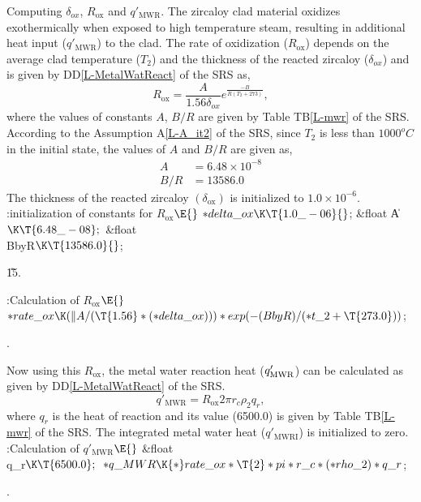 \documentclass[letterpaper,12pt,baseclass=report]{cweb-hy}
\begin{document}
{
\fi

Computing ${\delta_{ox}}$, $R_{\text{ox}}$ and $q'_{\text{MWR}}$.%
\label{delroxqmwr}
The zircaloy clad material oxidizes exothermically when	exposed	to high
temperature
steam, resulting in additional heat input ($q'_{\text{MWR}}$) to the clad. The
rate of
oxidization ($R_{\text{ox}}$) depends on the average clad temperature ($T_2$)
and the
thickness of the reacted zircaloy ($\delta_{ox}$) and is given by
DD\ref{L-MetalWatReact} of the SRS as,
\begin{equation}
{R_{\text{ox}}}= \frac{A}{1.56  \delta_{ox}} e^{\frac{-B}{R(T_2+273)}},
\end{equation}
where the values of constants $A$, $B/R$ are given by Table TB\ref{L-mwr} of
the SRS.
According to the Assumption A\ref{L-A_it2} of the SRS, since $T_2$ is less than
$1000^oC$
in the initial state, the values of $A$ and $B/R$ are given as,
\begin{align}
A&=6.48\times 10^{-8}\\
B/R&=13586.0 \label{a}
\end{align}
The thickness of the reacted zircaloy $(\delta_{\text{ox}})$ is initialized to
$1.0\times 10^{-6}$.
\Y\B\4:initialization of constants for $R_{\text{ox}}$\X${}\E{}$\6
${*}\\{delta\_ox}\K\T{1.0\_-06}{}$;\7
\&{float} \|A${}\K\T{6.48\_-08};{}$\6
\&{float} \\{BbyR}${}\K\T{13586.0}{}$;\par
\U15.\fi

\Y\B\4:Calculation of $R_{\text{ox}}$\X${}\E{}$\6
${*}\\{rate\_ox}\K(\|A/(\T{1.56}*({*}\\{delta\_ox})))*\\{exp}({-}(%
\\{BbyR})/({*}\\{t\_2}+\T{273.0})){}$;\par
{}.\fi

Now using this $R_{\text{ox}}$, the metal water reaction heat ($q'_{%
\mathrm{MWR}}$)
can be calculated as given by DD\ref{L-MetalWatReact} of the SRS.
\begin{equation}
q'_{\mathrm{MWR}}= {R_{\text{ox}}} 2\pi r_c  \rho_2 q_r,
\end{equation}
where $q_r$ is the heat of reaction and its value (6500.0) is given by Table
TB\ref{L-mwr} of the SRS.
The integrated metal water heat ($q'_{\mathrm{MWRI}}$) is initialized to zero.
\Y\B\4:Calculation of $q'_{\mathrm{MWR}}$\X${}\E{}$\6
\&{float} \\{q\_r}${}\K\T{6500.0};{}$\7
${}{*}\\{q\_MWR}\K{*}\\{rate\_ox}*\T{2}*\\{pi}*\\{r\_c}*({*}\\{rho\_2})*\\{q%
\_r}{}$;\par
{}.\fi

}
\end{document}
